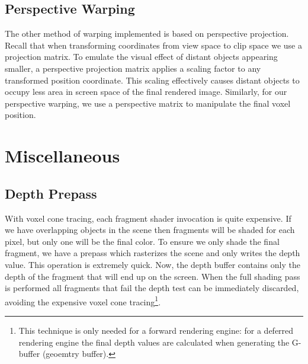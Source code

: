 

\subsection{Perspective Warping}
The other method of warping implemented is based on perspective projection. Recall that when transforming coordinates from view space to clip space we use a projection matrix. To emulate the visual effect of distant objects appearing smaller, a perspective projection matrix applies a scaling factor to any transformed position coordinate. This scaling effectively causes distant objects to occupy less area in screen space of the final rendered image. Similarly, for our perspective warping, we use a perspective matrix to manipulate the final voxel position.


\section{Miscellaneous}
\subsection{Depth Prepass}
With voxel cone tracing, each fragment shader invocation is quite expensive. If we have overlapping objects in the scene then fragments will be shaded for each pixel, but only one will be the final color. To ensure we only shade the final fragment, we have a prepass which rasterizes the scene and only writes the depth value. This operation is extremely quick. Now, the depth buffer contains only the depth of the fragment that will end up on the screen. When the full shading pass is performed all fragments that fail the depth test can be immediately discarded, avoiding the expensive voxel cone tracing\footnote{This technique is only needed for a forward rendering engine: for a deferred rendering engine the final depth values are calculated when generating the G-buffer (geoemtry buffer).}.





